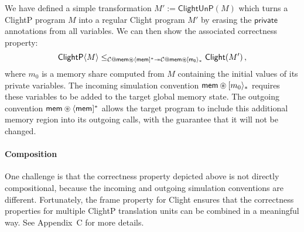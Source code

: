 \documentclass[acmsmall,screen,review,anonymous]{acmart}
\newcommand{\kw}[1]{\ensuremath{ \mathsf{#1} }}
\newcommand{\sepconj}{\oast}
\begin{document}
We have defined a simple transformation $M' := \kw{ClightUnP}(M)$
which turns a ClightP program $M$ into a regular Clight program $M'$
by erasing the $\kw{private}$ annotations from all variables.
We can then show the associated correctness property:
\[
  \kw{ClightP}\langle M \rangle \le_{
    \mathcal{C} \mathbin@ \kw{mem} \sepconj \langle \kw{mem} ]^*
    \twoheadrightarrow
    \mathcal{C} \mathbin@ \kw{mem} \sepconj [ \kw{m_0} \rangle_*}
  \kw{Clight}(M')
  \,,
\]
where $m_0$ is a memory share computed from $M$
containing the initial values of its private variables.
The incoming simulation convention $\kw{mem} \sepconj [m_0\rangle_*$
requires these variables to be added to the target global memory state.
The outgoing convention $\kw{mem} \sepconj \langle \kw{mem} ]^*$
allows the target program to include this additional memory region
into its outgoing calls,
with the guarantee that it will not be changed.



\paragraph{Composition}

One challenge is that the correctness property depicted above
is not directly compositional,
because the incoming and outgoing simulation conventions are different.
Fortunately,
the frame property for Clight ensures that
the correctness properties for multiple ClightP translation units
can be combined in a meaningful way.
See Appendix~C for more details. %

\end{document}
